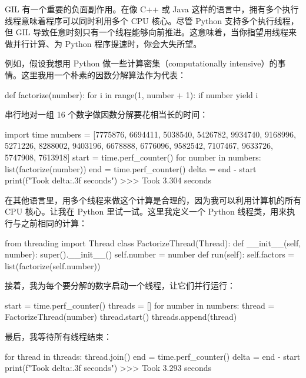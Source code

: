 GIL 有一个重要的负面副作用。在像 C++ 或 Java 这样的语言中，拥有多个执行线程意味着程序可以同时利用多个 CPU 核心。尽管 Python 支持多个执行线程，但 GIL 导致任意时刻只有一个线程能够向前推进。这意味着，当你指望用线程来做并行计算、为 Python 程序提速时，你会大失所望。

例如，假设我想用 Python 做一些计算密集（computationally intensive）的事情。这里我用一个朴素的因数分解算法作为代表：

\begin{codebox}[python]
def factorize(number):
    for i in range(1, number + 1):
        if number %
            yield i
\end{codebox}

串行地对一组 16 个数字做因数分解要花相当长的时间：

\begin{codebox}[python]
import time
numbers = [7775876, 6694411, 5038540, 5426782,
           9934740, 9168996, 5271226, 8288002,
           9403196, 6678888, 6776096, 9582542,
           7107467, 9633726, 5747908, 7613918]
start = time.perf_counter()
for number in numbers:
    list(factorize(number))
end = time.perf_counter()
delta = end - start
print(f"Took {delta:.3f} seconds")
>>>
Took 3.304 seconds
\end{codebox}

在其他语言里，用多个线程来做这个计算是合理的，因为我可以利用计算机的所有 CPU 核心。让我在 Python 里试一试。这里我定义一个 Python 线程类，用来执行与之前相同的计算：

\begin{codebox}[python]
from threading import Thread
class FactorizeThread(Thread):
    def __init__(self, number):
        super().__init__()
        self.number = number
    def run(self):
        self.factors = list(factorize(self.number))
\end{codebox}

接着，我为每个要分解的数字启动一个线程，让它们并行运行：

\begin{codebox}[python]
start = time.perf_counter()
threads = []
for number in numbers:
    thread = FactorizeThread(number)
    thread.start()
    threads.append(thread)
\end{codebox}

最后，我等待所有线程结束：

\begin{codebox}[python]
for thread in threads:
    thread.join()
end = time.perf_counter()
delta = end - start
print(f"Took {delta:.3f} seconds")
>>>
Took 3.293 seconds
\end{codebox}

